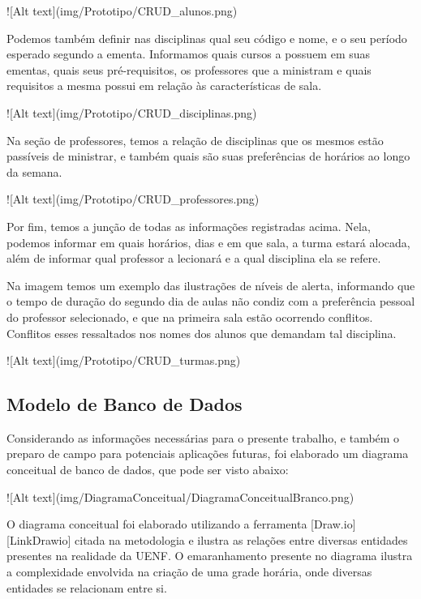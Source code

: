     ![Alt text](img/Prototipo/CRUD_alunos.png)

    Podemos também definir nas disciplinas qual seu código e nome, e o seu período esperado segundo a ementa. Informamos quais cursos a possuem em suas ementas, quais seus pré-requisitos, os professores que a ministram e quais requisitos a mesma possui em relação às características de sala.

    ![Alt text](img/Prototipo/CRUD_disciplinas.png)

    Na seção de professores, temos a relação de disciplinas que os mesmos estão passíveis de ministrar, e também quais são suas preferências de horários ao longo da semana.

    ![Alt text](img/Prototipo/CRUD_professores.png)

    Por fim, temos a junção de todas as informações registradas acima. Nela, podemos informar em quais horários, dias e em que sala, a turma estará alocada, além de informar qual professor a lecionará e a qual disciplina ela se refere.

    Na imagem temos um exemplo das ilustrações de níveis de alerta, informando que o tempo de duração do segundo dia de aulas não condiz com a preferência pessoal do professor selecionado, e que na primeira sala estão ocorrendo conflitos. Conflitos esses ressaltados nos nomes dos alunos que demandam tal disciplina.

    ![Alt text](img/Prototipo/CRUD_turmas.png)

\subsection{Modelo de Banco de Dados} %

    Considerando as informações necessárias para o presente trabalho, e também o preparo de campo para potenciais aplicações futuras, foi elaborado um diagrama conceitual de banco de dados, que pode ser visto abaixo:

    ![Alt text](img/DiagramaConceitual/DiagramaConceitualBranco.png)


    O diagrama conceitual foi elaborado utilizando a ferramenta [Draw.io][LinkDrawio] citada na metodologia e ilustra as relações entre diversas entidades presentes na realidade da UENF. O emaranhamento presente no diagrama ilustra a complexidade envolvida na criação de uma grade horária, onde diversas entidades se relacionam entre si.

